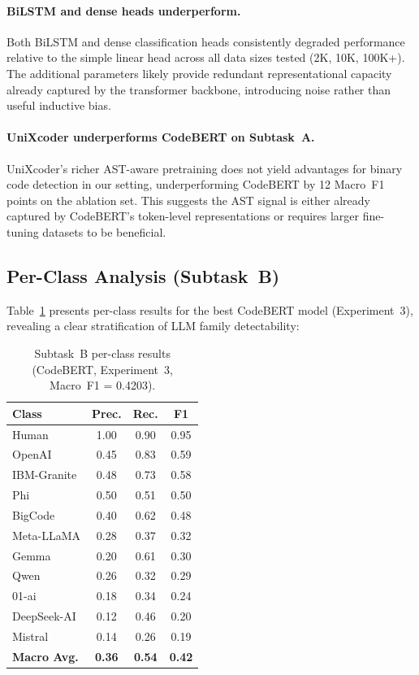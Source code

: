\documentclass[11pt]{article}
\begin{document}
\paragraph{BiLSTM and dense heads underperform.} Both BiLSTM and dense classification heads consistently degraded performance relative to the simple linear head across all data sizes tested (2K, 10K, 100K+). The additional parameters likely provide redundant representational capacity already captured by the transformer backbone, introducing noise rather than useful inductive bias.

\paragraph{UniXcoder underperforms CodeBERT on Subtask~A.} UniXcoder's richer AST-aware pretraining does not yield advantages for binary code detection in our setting, underperforming CodeBERT by 12 Macro~F1 points on the ablation set. This suggests the AST signal is either already captured by CodeBERT's token-level representations or requires larger fine-tuning datasets to be beneficial.

\subsection{Per-Class Analysis (Subtask~B)}

Table~\ref{tab:taskB_perclass} presents per-class results for the best CodeBERT model (Experiment~3), revealing a clear stratification of LLM family detectability:

\begin{table}[ht]
\centering
\footnotesize
\begin{tabularx}{\columnwidth}{@{}l c c c@{}}
\toprule
\textbf{Class} & \textbf{Prec.} & \textbf{Rec.} & \textbf{F1} \\ \midrule
Human & 1.00 & 0.90 & 0.95 \\
OpenAI & 0.45 & 0.83 & 0.59 \\
IBM-Granite & 0.48 & 0.73 & 0.58 \\
Phi & 0.50 & 0.51 & 0.50 \\
BigCode & 0.40 & 0.62 & 0.48 \\
Meta-LLaMA & 0.28 & 0.37 & 0.32 \\
Gemma & 0.20 & 0.61 & 0.30 \\
Qwen & 0.26 & 0.32 & 0.29 \\
01-ai & 0.18 & 0.34 & 0.24 \\
DeepSeek-AI & 0.12 & 0.46 & 0.20 \\
Mistral & 0.14 & 0.26 & 0.19 \\ \midrule
\textbf{Macro Avg.} & \textbf{0.36} & \textbf{0.54} & \textbf{0.42} \\
\bottomrule
\end{tabularx}
\caption{Subtask~B per-class results (CodeBERT, Experiment~3, Macro~F1 = 0.4203).}
\label{tab:taskB_perclass}
\end{table}
\end{document}
